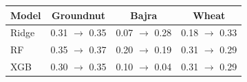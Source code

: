 \begin{tabular}{lccc}
\toprule
Model & Groundnut & Bajra & Wheat \\
\midrule
Ridge & 0.31 $\rightarrow$ 0.35 & 0.07 $\rightarrow$ 0.28 & 0.18 $\rightarrow$ 0.33 \\
RF & 0.35 $\rightarrow$ 0.37 & 0.20 $\rightarrow$ 0.19 & 0.31 $\rightarrow$ 0.29 \\
XGB & 0.30 $\rightarrow$ 0.35 & 0.10 $\rightarrow$ 0.04 & 0.31 $\rightarrow$ 0.29 \\
\bottomrule
\end{tabular}
